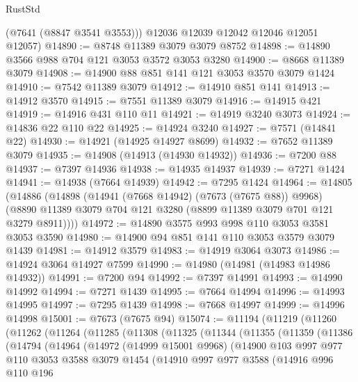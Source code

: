 \begin{lexlean}{RustStd}
\begin{coremodule}
{\begin{coremodule}
{{{{{{{{{{{{{{{{{{{{{{{{{{{{{{{{        (@7641 (@8847 @3541 @3553)))
      @12036
      @12039
      @12042
      @12046
      @12051
      @12057)
@14890 := @8748 @11389 @3079 @3079 @8752
@14898 := @14890 @3566 @988 @704 @121 @3053 @3572 @3053 @3280
@14900 := @8668 @11389 @3079
@14908 := @14900 @88 @851 @141 @121 @3053 @3570 @3079 @1424
@14910 := @7542 @11389 @3079
@14912 := @14910 @851 @141
@14913 := @14912 @3570
@14915 := @7551 @11389 @3079
@14916 := @14915 @421
@14919 := @14916 @431 @110 @11
@14921 := @14919 @3240 @3073
@14924 := @14836 @22 @110 @22
@14925 := @14924 @3240
@14927 := @7571 (@14841 @22)
@14930 := @14921 (@14925 @14927 @8699)
@14932 := @7652 @11389 @3079
@14935 := @14908 (@14913 (@14930 @14932))
@14936 := @7200 @88
@14937 := @7397 @14936
@14938 := @14935 @14937
@14939 := @7271 @1424
@14941 := @14938 (@7664 @14939)
@14942 := @7295 @1424
@14964 := @14805
    (@14886
      (@14898
        (@14941 (@7668 @14942) (@7673 (@7675 @88)) @9968)
        (@8890 @11389 @3079 @704 @121 @3280 (@8899 @11389 @3079 @701 @121 @3279 @8911))))
@14972 := @14890 @3575 @993 @998 @110 @3053 @3581 @3053 @3590
@14980 := @14900 @94 @851 @141 @110 @3053 @3579 @3079 @1439
@14981 := @14912 @3579
@14983 := @14919 @3064 @3073
@14986 := @14924 @3064 @14927 @7599
@14990 := @14980 (@14981 (@14983 @14986 @14932))
@14991 := @7200 @94
@14992 := @7397 @14991
@14993 := @14990 @14992
@14994 := @7271 @1439
@14995 := @7664 @14994
@14996 := @14993 @14995
@14997 := @7295 @1439
@14998 := @7668 @14997
@14999 := @14996 @14998
@15001 := @7673 (@7675 @94)
@15074 := @11194
    (@11219
      (@11260
        (@11262
          (@11264
            (@11285
              (@11308
                (@11325
                  (@11344
                    (@11355
                      (@11359
                        (@11386
                          (@14794
                            (@14964
                              (@14972
                                (@14999 @15001 @9968)
                                (@14900
                                  @103
                                  @997
                                  @977
                                  @110
                                  @3053
                                  @3588
                                  @3079
                                  @1454
                                  (@14910
                                    @997
                                    @977
                                    @3588
                                    (@14916
                                      @996
                                      @110
                                      @196
}}}}}}}}}}}}}}}}}}}}}}}}}}}}}}}}
\end{coremodule}}
\end{coremodule}
\end{lexlean}
